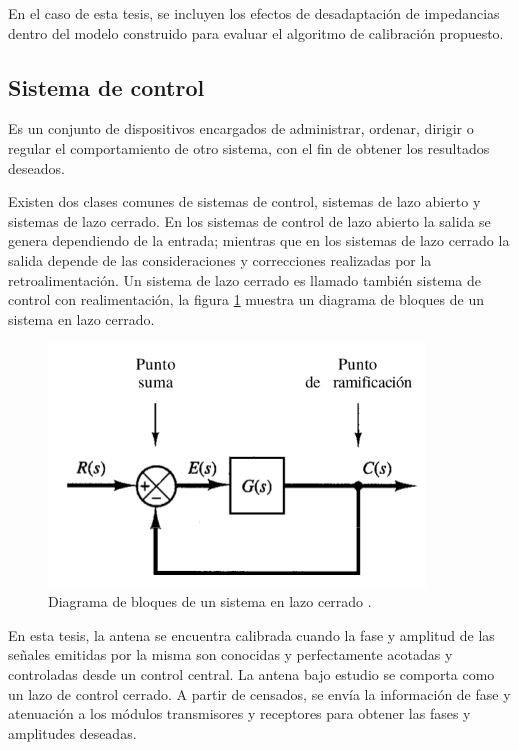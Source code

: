 En el caso de esta tesis, se incluyen los efectos de desadaptación de impedancias dentro del modelo construido para evaluar el
algoritmo de calibración propuesto.


\subsection{Sistema de control}

Es un conjunto de dispositivos encargados de administrar, ordenar, dirigir o regular el comportamiento de otro sistema, con el
fin de obtener los resultados deseados.

Existen dos clases comunes de sistemas de control, sistemas de lazo abierto y sistemas de lazo cerrado. En los sistemas de
control de lazo abierto la salida se genera dependiendo de la entrada; mientras que en los sistemas de lazo cerrado la salida
depende de las consideraciones y correcciones realizadas por la retroalimentación. Un sistema de lazo cerrado es llamado
también sistema de control con realimentación, la figura \ref{fig:closedLoop} muestra un diagrama de bloques de un sistema en
lazo cerrado.

\begin{figure}[H]
 \centering
 \includegraphics[width=10cm]{gfx/closedLoop.png}
 \caption{Diagrama de bloques de un sistema en lazo cerrado \cite{Tobergte2013}.}
 \label{fig:closedLoop}
\end{figure}

En esta tesis, la antena se encuentra calibrada cuando la fase y amplitud de las señales emitidas por la misma son conocidas y
perfectamente acotadas y controladas desde un control central. La antena bajo estudio se comporta como un lazo de control
cerrado. A partir de censados, se envía la información de fase y atenuación a los módulos transmisores y receptores para obtener
las fases y amplitudes deseadas.


